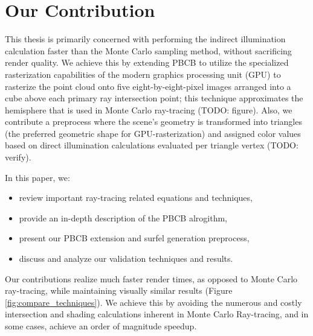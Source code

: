 \section{Our Contribution}
This thesis is primarily concerned with performing the indirect illumination calculation faster than the Monte Carlo sampling method, without sacrificing render quality. We achieve this by extending PBCB to utilize the specialized rasterization capabilities of the modern graphics processing unit (GPU) to rasterize the point cloud onto five eight-by-eight-pixel images arranged into a cube above each primary ray intersection point; this technique approximates the hemisphere that is used in Monte Carlo ray-tracing (TODO: figure). Also, we contribute a preprocess where the scene's geometry is transformed into triangles (the preferred geometric shape for GPU-rasterization) and assigned color values based on direct illumination calculations evaluated per triangle vertex (TODO: verify).

\noindent In this paper, we:
\begin{itemize}
\item review important ray-tracing related equations and techniques,
\item provide an in-depth description of the PBCB alrogithm,
\item present our PBCB extension and surfel generation preprocess,
\item discuss and analyze our validation techniques and results.
\end{itemize}

Our contributions realize much faster render times, as opposed to Monte Carlo ray-tracing, while maintaining visually similar results (Figure \ref{fig:compare_techniques}). We achieve this by avoiding the numerous and costly intersection and shading calculations inherent in Monte Carlo Ray-tracing, and in some cases, achieve an order of magnitude speedup.

